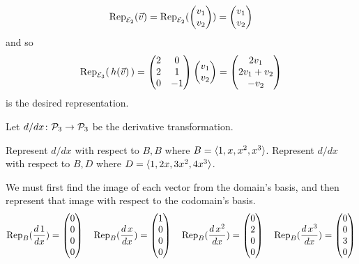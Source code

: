 \begin{exercises}
\begin{answer}
\begin{exparts}
\begin{equation*}
            \rep{\vec{v}}{\stdbasis_2}
            =\rep{\colvec{v_1 \\ v_2}}{\stdbasis_2}
            =\colvec{v_1 \\ v_2}
          \end{equation*}
          and so
          \begin{equation*}
            \rep{\,h(\vec{v})\,}{\stdbasis_3}
            =\begin{pmatrix}
              2  &0  \\
              2  &1  \\
              0  &-1
            \end{pmatrix}
            \colvec{v_1 \\ v_2}
            =\colvec{2v_1 \\ 2v_1+v_2 \\ -v_2}
          \end{equation*}
          is the desired representation.
      \end{exparts}  
    \end{answer}
  \recommended \item  
    Let \( \map{d/dx}{\polyspace_3}{\polyspace_3} \) be the derivative
    transformation.
    \begin{exparts}
      \partsitem Represent \( d/dx \) with respect to \( B,B \) where
        \( B=\sequence{1,x,x^2,x^3} \).
      \partsitem Represent \( d/dx \) with respect to \( B,D \) where
        \( D=\sequence{1,2x,3x^2,4x^3} \).
    \end{exparts}
    \begin{answer}
      \begin{exparts*}
        \partsitem 
        We must first find the image of each vector from the domain's basis,
        and then represent that image with respect to the codomain's basis.
        \begin{equation*}
          \rep{\frac{d\,1}{dx}}{B}=\colvec{0 \\ 0 \\ 0 \\ 0}
          \quad
          \rep{\frac{d\,x}{dx}}{B}=\colvec{1 \\ 0 \\ 0 \\ 0}
          \quad
          \rep{\frac{d\,x^2}{dx}}{B}=\colvec{0 \\ 2 \\ 0 \\ 0}
          \quad
          \rep{\frac{d\,x^3}{dx}}{B}=\colvec{0 \\ 0 \\ 3 \\ 0}

\end{equation*}
\end{exparts*}
\end{answer}
\end{exercises}
